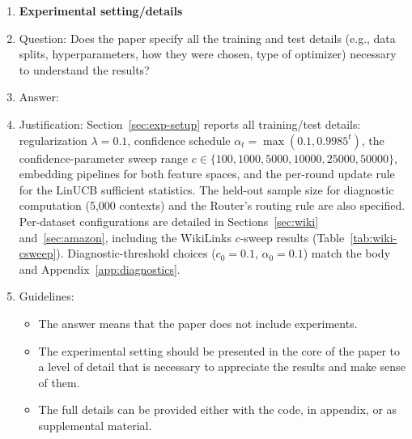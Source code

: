 \documentclass{article}
\theoremstyle{definition}
\theoremstyle{remark}
\theoremstyle{remark}
\begin{document}
\begin{enumerate}
\item {\bf Experimental setting/details}
    \item[] Question: Does the paper specify all the training and test details (e.g., data splits, hyperparameters, how they were chosen, type of optimizer) necessary to understand the results?
    \item[] Answer: \answerYes{} %
    \item[] Justification: Section~\ref{sec:exp-setup} reports all training/test details: regularization $\lambda=0.1$, confidence schedule $\alpha_t=\max(0.1, 0.9985^t)$, the confidence-parameter sweep range $c\in\{100, 1000, 5000, 10000, 25000, 50000\}$, embedding pipelines for both feature spaces, and the per-round update rule for the LinUCB sufficient statistics. The held-out sample size for diagnostic computation (5{,}000 contexts) and the Router's routing rule are also specified. Per-dataset configurations are detailed in Sections~\ref{sec:wiki} and~\ref{sec:amazon}, including the WikiLinks $c$-sweep results (Table~\ref{tab:wiki-csweep}). Diagnostic-threshold choices ($c_0=0.1$, $\alpha_0=0.1$) match the body and Appendix~\ref{app:diagnostics}.
    \item[] Guidelines:
    \begin{itemize}
        \item The answer \answerNA{} means that the paper does not include experiments.
        \item The experimental setting should be presented in the core of the paper to a level of detail that is necessary to appreciate the results and make sense of them.
        \item The full details can be provided either with the code, in appendix, or as supplemental material.
    \end{itemize}


\end{enumerate}
\end{document}
